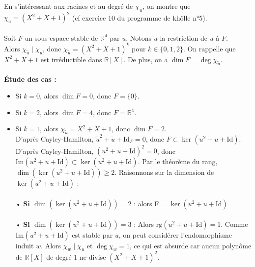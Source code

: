 \documentclass[a4paper,12pt]{article}
\begin{document}
    \begin{correctionbox}
        En s'intéressant aux racines et au degré de \( \chi_u \), on montre que \( \chi_u = (X^2 + X + 1)^2 \) (cf exercice 10 du programme de khôlle n°5). \\\\
        Soit \( F \) un sous-espace stable de \( \mathbb{R}^4 \) par \( u \). Notons \( \tilde{u} \) la restriction de \( u \) à \( F \). \\[2pt]
        Alors \( \chi_{\tilde{u}} \mid \chi_u \), donc \( \chi_{\tilde{u}} = (X^2 + X + 1)^k \) pour \( k \in \{0, 1, 2\} \). On rappelle que \( X^2 + X + 1 \) est irréductible dans \( \mathbb{R}[X] \). De plus, on a \( \dim F = \deg \chi_{\tilde{u}} \). \\\\
        \textbf{Étude des cas :} \\[2pt]
        \begin{itemize}
            \item Si \( k = 0 \), alors \( \dim F = 0 \), donc \( F = \{0\} \). \\[2pt]
            \item Si \( k = 2 \), alors \( \dim F = 4 \), donc \( F = \mathbb{R}^4 \). \\[2pt]
            \item Si \( k = 1 \), alors \( \chi_{\tilde{u}} = X^2 + X + 1 \), donc \( \dim F = 2 \). \\[2pt]
            D'après Cayley-Hamilton, \( \tilde{u}^2 + \tilde{u} + \mathrm{Id}_F = 0 \), donc \( F \subset \ker(u^2 + u + \mathrm{Id}) \). \\[2pt]
            D'après Cayley-Hamilton, \( (u^2 + u + \mathrm{Id})^2 = 0 \), donc \( \mathrm{Im}(u^2 + u + \mathrm{Id}) \subset \ker(u^2 + u + \mathrm{Id}) \). Par le théorème du rang, \( \dim(\ker(u^2 + u + \mathrm{Id})) \geq 2 \). Raisonnons sur la dimension de \( \ker(u^2 + u + \mathrm{Id}) \) :\\\\
                • \textbf{Si \( \dim(\ker(u^2 + u + \mathrm{Id})) = 2 \)} : alors F = \( \ker(u^2 + u + \mathrm{Id}) \)\\\\
                • \textbf{Si \( \dim(\ker(u^2 + u + \mathrm{Id})) = 3 \)} : Alors \( \mathrm{rg}(u^2 + u + \mathrm{Id}) = 1 \). Comme \( \mathrm{Im}(u^2 + u + \mathrm{Id}) \) est stable par \( u \), on peut considérer l'endomorphisme induit \( w \). Alors \( \chi_w \mid \chi_u \) et \( \deg \chi_w = 1 \), ce qui est absurde car aucun polynôme de \( \mathbb{R}[X] \) de degré 1 ne divise \( (X^2 + X + 1)^2 \). \\\\

\end{itemize}
\end{correctionbox}
\end{document}
